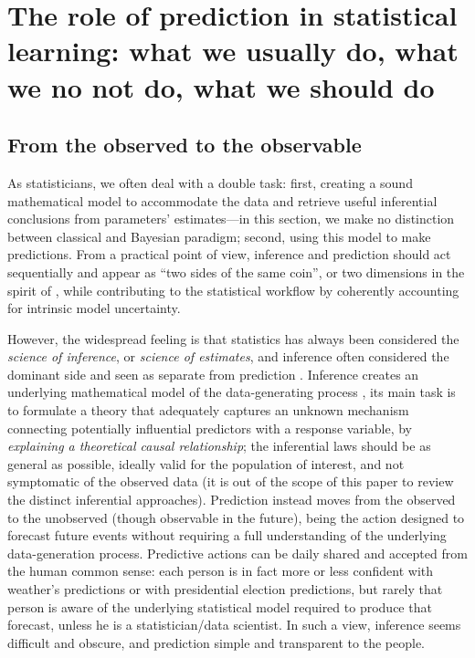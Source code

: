 \documentclass{statsoc}
\begin{document}
\section{The role of prediction in statistical learning: what we usually do, what we no not do, what we should do}
\label{sec:role}

\subsection{From the observed to the observable}

As statisticians, we often deal with a double task: first, creating a sound mathematical model to accommodate the data and retrieve useful inferential conclusions from 
parameters' estimates---in this section, we make no distinction between classical and Bayesian paradigm; second, using this model to make predictions. From a practical point of view, inference and prediction should act sequentially and appear as ``two sides of the same coin'', or two dimensions in the spirit of \cite{shmueli2010explain}, while contributing to the statistical workflow by coherently accounting for intrinsic model uncertainty.



However, the widespread feeling is that statistics has always been considered the \emph{science of inference}, or \emph{science of estimates}, and inference often considered the dominant side and seen as separate from prediction \citep{shmueli2010explain}.  Inference creates 
an underlying mathematical model of the data-generating process \citep{bzdok2018points}, its main task is to formulate a theory that adequately captures an unknown mechanism connecting potentially influential predictors with a response variable, by \emph{explaining a theoretical causal relationship}; the 
inferential laws should be as general as possible, ideally valid for the population of interest, and not symptomatic of the observed data (it is out of the scope of this paper to review the distinct inferential 
approaches). Prediction instead moves from the observed to the unobserved (though observable in the future), being the action designed to forecast future events without requiring a full understanding of the underlying data-generation process. Predictive actions can be daily shared and accepted from the human common sense: each person is in fact more or less confident with weather's predictions or with presidential election predictions, but rarely that person is aware of the underlying 
statistical model required to produce that forecast, unless he is a statistician/data scientist. In such a view, inference seems difficult and obscure, and prediction simple and transparent 
to the people. 
\end{document}
